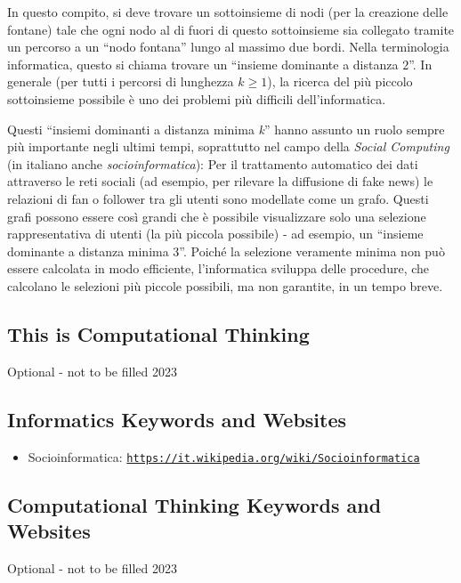 \documentclass[a4paper,11pt]{report}
\newcommand{\BrochureUrlText}[1]{\texttt{#1}}
\begin{document}
In questo compito, si deve trovare un sottoinsieme di nodi (per la creazione delle fontane) tale che ogni nodo al di fuori di questo sottoinsieme sia collegato tramite un percorso a un \enquote{nodo fontana} lungo al massimo due bordi.  Nella terminologia informatica, questo si chiama trovare un \enquote{insieme dominante a distanza $2$}.  In generale (per tutti i percorsi di lunghezza ${k \geq 1}$), la ricerca del più piccolo sottoinsieme possibile è uno dei problemi più difficili dell’informatica.

Questi \enquote{insiemi dominanti a distanza minima \emph{k}} hanno assunto un ruolo sempre più importante negli ultimi tempi, soprattutto nel campo della \emph{Social Computing} (in italiano anche \emph{socioinformatica}):
Per il trattamento automatico dei dati attraverso le reti sociali (ad esempio, per rilevare la diffusione di fake news)
le relazioni di fan o follower tra gli utenti sono modellate come un grafo.
Questi grafi possono essere così grandi che è possibile visualizzare solo una selezione rappresentativa di utenti (la più piccola possibile) - ad esempio, un \enquote{insieme dominante a distanza minima $3$}.
Poiché la selezione veramente minima non può essere calcolata in modo efficiente, l’informatica sviluppa delle procedure,
che calcolano le selezioni più piccole possibili, ma non garantite, in un tempo breve.


\subsection*{This is Computational Thinking}

Optional - not to be filled 2023


\subsection*{Informatics Keywords and Websites}

\begin{itemize}
  \item Socioinformatica: \href{https://it.wikipedia.org/wiki/Socioinformatica}{\BrochureUrlText{https://it.wikipedia.org/wiki/Socioinformatica}}
\end{itemize}


\subsection*{Computational Thinking Keywords and Websites}

Optional - not to be filled 2023
\end{document}

